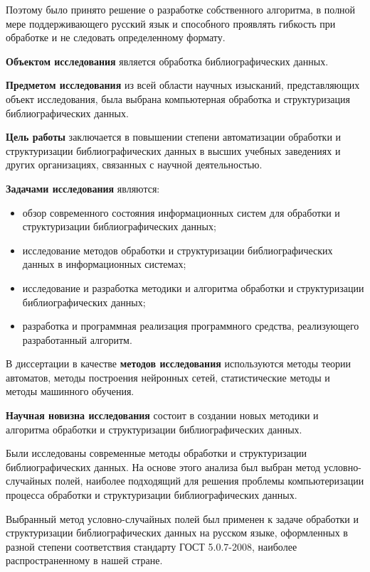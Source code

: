 Поэтому было принято решение о разработке собственного алгоритма, в полной мере поддерживающего русский язык и способного проявлять гибкость при обработке и не следовать определенному формату.

\textbf{Объектом исследования} является обработка библиографических данных.

\textbf{Предметом исследования} из всей области научных изысканий, представляющих объект исследования, была выбрана компьютерная обработка и структуризация библиографических данных.

\textbf{Цель работы} заключается в повышении степени автоматизации обработки и структуризации библиографических данных в высших учебных заведениях и других организациях, связанных с научной деятельностью.

\textbf{Задачами исследования} являются:
\begin{itemize}
	\item обзор современного состояния информационных систем для обработки и структуризации библиографических данных;
	\item исследование методов обработки и структуризации библиографических данных в информационных системах;
	\item исследование и разработка методики и алгоритма обработки и структуризации библиографических данных;
	\item разработка и программная реализация программного средства, реализующего разработанный алгоритм.
\end{itemize}

В диссертации в качестве \textbf{методов исследования} используются методы теории автоматов, методы построения нейронных сетей, статистические методы и методы машинного обучения.

\textbf{Научная новизна исследования} состоит в создании новых методики и алгоритма обработки и структуризации библиографических данных.

Были исследованы современные методы обработки и структуризации библиографических данных. На основе этого анализа был выбран метод условно-случайных полей, наиболее подходящий для решения проблемы компьютеризации процесса обработки и структуризации библиографических данных.

Выбранный метод условно-случайных полей был применен к задаче обработки и структуризации библиографических данных на русском языке, оформленных в разной степени соответствия стандарту ГОСТ 5.0.7-2008, наиболее распространенному в нашей стране.

